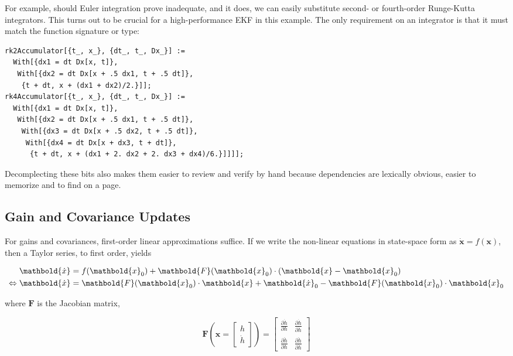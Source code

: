 \documentclass[10pt,oneside,x11names]{article}
\begin{document}
For example, should Euler integration prove inadequate, and it does, we can
easily substitute second- or fourth-order Runge-Kutta integrators. This turns
out to be crucial for a high-performance EKF in this example. The only
requirement on an integrator is that it must match the function signature or
type:

\begin{verbatim}
rk2Accumulator[{t_, x_}, {dt_, t_, Dx_}] :=
  With[{dx1 = dt Dx[x, t]},
   With[{dx2 = dt Dx[x + .5 dx1, t + .5 dt]},
    {t + dt, x + (dx1 + dx2)/2.}]];
rk4Accumulator[{t_, x_}, {dt_, t_, Dx_}] :=
  With[{dx1 = dt Dx[x, t]},
   With[{dx2 = dt Dx[x + .5 dx1, t + .5 dt]},
    With[{dx3 = dt Dx[x + .5 dx2, t + .5 dt]},
     With[{dx4 = dt Dx[x + dx3, t + dt]},
      {t + dt, x + (dx1 + 2. dx2 + 2. dx3 + dx4)/6.}]]]];
\end{verbatim}

Decomplecting these bits also makes them easier to review and verify by hand
because dependencies are lexically obvious, easier
to memorize and to find on a page.

\subsection{Gain and Covariance Updates}
\label{sec:orgheadline8}

For gains and covariances, first-order linear approximations
suffice. If we write the non-linear equations in state-space form as
\(\mathbold{\dot{x}}=f(\mathbold{x})\), then a Taylor series, to first order, yields

\begin{align}
\notag
\mathbold{\dot{x}} &= f(\mathbold{x}_0) + \mathbold{F}(\mathbold{x}_0)\cdot(\mathbold{x}-\mathbold{x}_0) \\
\notag
\Leftrightarrow\mathbold{\dot{x}} &= \mathbold{F}(\mathbold{x}_0)\cdot\mathbold{x} + \mathbold{\dot{x}}_0 - \mathbold{F}(\mathbold{x}_0)\cdot\mathbold{x}_0 
\end{align}

\noindent where \(\mathbold{F}\) is the Jacobian matrix, 

\begin{equation}
\mathbold{F}
\left(
\mathbold{x}=\begin{bmatrix}h\\ \dot{h} \end{bmatrix}
\right) =
\begin{bmatrix}
\underset {  }{ \frac { \partial \dot { h }  }{ \partial h }  }  &
\underset {  }{ \frac { \partial \dot { h }  }{ \partial \dot { h }  }  }  \\
\frac { \partial \ddot { h }  }{ \partial h }  &
\frac { \partial \ddot { h }  }{ \partial \dot { h }  }
\end{bmatrix}
\end{equation}
\end{document}
